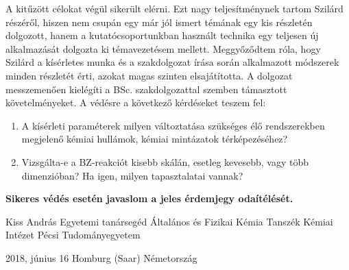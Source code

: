 \documentclass[11pt, a4paper]{letter} %
\begin{document}
\begin{letter}{
}
A kitűzött célokat végül sikerült elérni. Ezt nagy teljesítménynek tartom Szilárd részéről, hiszen nem csupán egy már jól ismert témának egy kis részletén dolgozott, hanem a kutatócsoportunkban használt technika egy teljesen új alkalmazását dolgozta ki témavezetésem mellett. Meggyőződtem róla, hogy Szilárd a kísérletes munka és a szakdolgozat írása során alkalmazott módszerek minden részletét érti, azokat magas szinten elsajátította. A dolgozat messzemenően kielégíti a BSc. szakdolgozattal szemben támasztott követelményeket. A védésre a következő kérdéseket teszem fel:

\begin{enumerate}
\item A kísérleti paraméterek milyen változtatása szükséges élő rendszerekben megjelenő kémiai hullámok, kémiai mintázatok térképezéséhez?
\item Vizsgálta-e a BZ-reakciót kisebb skálán, esetleg kevesebb, vagy több dimenzióban? Ha igen, milyen tapasztalatai vannak?
\end{enumerate}

\begin{center}
\textbf{Sikeres védés esetén javaslom a jeles érdemjegy odaítélését.}
\end{center}

Kiss András
Egyetemi tanársegéd
Általános és Fizikai Kémia Tanszék
Kémiai Intézet
Pécsi Tudományegyetem


2018, június 16
Homburg (Saar)
Németország





\end{letter}
\end{document}
